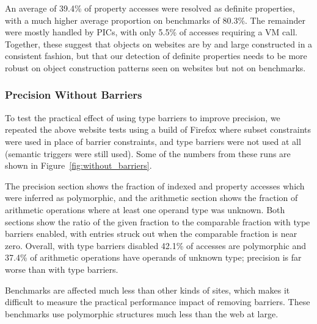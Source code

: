 An average of 39.4\% of property accesses were resolved as definite properties,
with a much higher average proportion on benchmarks of 80.3\%.
The remainder were mostly handled by PICs, with only 5.5\% of
accesses requiring a VM call.
Together, these suggest that objects on websites are by and large
constructed in a consistent fashion, but that
our detection of definite properties needs
to be more robust on object construction patterns seen on websites but
not on benchmarks.

\subsubsection{Precision Without Barriers}
\label{sec:without_barriers}

To test the practical effect of using type barriers to improve precision,
we repeated the above website tests using a build of Firefox where
subset constraints were used in place of barrier constraints,
and type barriers were not used at all (semantic triggers were still used).
Some of the numbers from these runs are shown in Figure~\ref{fig:without_barriers}.

The precision section shows the fraction of indexed and property accesses which
were inferred as polymorphic, and the arithmetic section shows the fraction
of arithmetic operations where at least one operand type was unknown.
Both sections show the ratio of the given fraction to the comparable fraction
with type barriers enabled,
with entries struck out when the comparable fraction is near zero.
Overall, with type barriers disabled 42.1\% of accesses are polymorphic and 37.4\%
of arithmetic operations have operands of unknown type; precision is far worse
than with type barriers.

Benchmarks are affected much less than other kinds of sites,
which makes it difficult to measure the practical performance impact 
of removing barriers.
These benchmarks use polymorphic structures much less
than the web at large.

